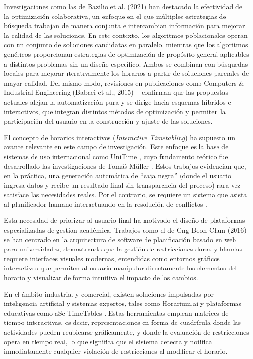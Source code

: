 \documentclass{article}
\begin{document}
Investigaciones como las de Bazilio et al. (2021) \cite{bazilio2021} han destacado la efectividad de la optimización colaborativa, un enfoque en el que múltiples estrategias de búsqueda trabajan de manera conjunta e intercambian información para mejorar la calidad de las soluciones. En este contexto, los algoritmos poblacionales operan con un conjunto de soluciones candidatas en paralelo, mientras que los algoritmos genéricos proporcionan estrategias de optimización de propósito general aplicables a distintos problemas sin un diseño específico. Ambos se combinan con búsquedas locales para mejorar iterativamente los horarios a partir de soluciones parciales de mayor calidad. Del mismo modo, revisiones en publicaciones como Computers \& Industrial Engineering (Babaei et al., 2015)  \ \cite{babaei2015} confirman que las propuestas actuales alejan la automatización pura y se dirige hacia esquemas híbridos e interactivos, que integran distintos métodos de optimización y permiten la participación del usuario en la construcción y ajuste de las soluciones.

El concepto de horarios interactivos (\textit{Interactive Timetabling}) \cite{muller2005} ha supuesto un avance relevante en este campo de investigación. Este enfoque es la base de sistemas de uso internacional como UniTime \cite{muller2005}, cuyo fundamento teórico fue desarrollado las investigaciones de Tomáš Müller \cite{muller2005}. Estos trabajos evidencian que, en la práctica, una generación automática de ``caja negra'' (donde el usuario ingresa datos y recibe un resultado final sin transparencia del proceso) rara vez satisface las necesidades reales. Por el contrario, se requiere un sistema que asista al planificador humano interactuando en la resolución de conflictos \cite{muller2005}.

Esta necesidad de priorizar al usuario final ha motivado el diseño de plataformas especializadas de gestión académica. Trabajos como el de Ong Boon Chun (2016) \cite{ong2016} se han centrado en la arquitectura de software de planificación basado en web para universidades, demostrando que la gestión de restricciones duras y blandas requiere interfaces visuales modernas, entendidas como entornos gráficos interactivos que permiten al usuario manipular directamente los elementos del horario y visualizar de forma intuitiva el impacto de los cambios.

En el ámbito industrial y comercial, existen soluciones impulsadas por inteligencia artificial y sistemas expertos, tales como Horarium.ai \cite{horarium} y plataformas educativas como aSc TimeTables \cite{asc}. Estas herramientas emplean matrices de tiempo interactivas, es decir, representaciones en forma de cuadrícula donde las actividades pueden reubicarse gráficamente, y donde la evaluación de restricciones opera en tiempo real, lo que significa que el sistema detecta y notifica inmediatamente cualquier violación de restricciones al modificar el horario.
\end{document}
